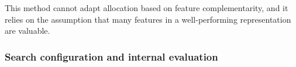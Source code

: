 This method cannot adapt allocation based on feature complementarity, and it relies on the assumption that many features in a well-performing representation are valuable.


\subsubsection{Search configuration and internal evaluation}
